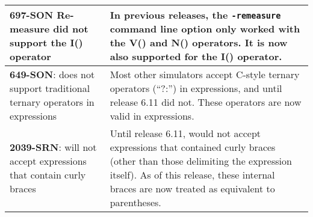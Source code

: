 {\begin{longtable}[h] {>{\raggedright\small}m{2in}|>{\raggedright\let\\\tabularnewline\small}m{3.5in}}
\textbf{697-SON} Re-measure did not support the  I() operator & In previous \Xyce{} 
releases, the \texttt{-remeasure} command line option only worked with the V() 
and N() operators.  It is now also supported for the I() operator. \\ \hline 

\textbf{649-SON}: \Xyce{} does not support traditional ternary operators in expressions &
 Most other simulators accept C-style ternary operators (``?:'') in
 expressions, and until release 6.11 \Xyce{} did not.  These operators
 are now valid in \Xyce{} expressions. \\ \hline

\textbf{2039-SRN}: \Xyce{} will not accept expressions that contain curly braces &
  Until release 6.11, \Xyce{} would not accept expressions that
  contained curly braces (other than those delimiting the expression
  itself).  As of this release, these internal braces are now treated
  as equivalent to parentheses.  \\ \hline

\end{longtable}
}
